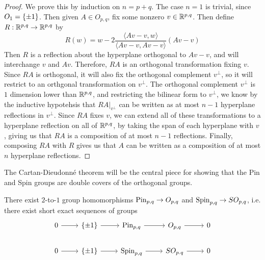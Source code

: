 %
\begin{proof}
We prove this by induction on $n = p+q$. The case $n=1$ is trivial, since
$O_1 = \left\lbrace \pm 1 \right\rbrace$. Then given $A \in O_{p,q}$, fix some nonzero $v \in \mathbb{R}^{p,q}$.
Then define $R : \mathbb{R}^{p,q} \to \mathbb{R}^{p,q}$ by
\[
R(w) = w - 2 \frac{\langle Av - v,w \rangle}{\langle Av -v, Av - v\rangle}(Av - v)
\]
Then $R$ is a reflection about the hyperplane orthogonal to $Av - v$,
and will interchange $v$ and $Av$. Therefore, $RA$ is an orthogonal transformation
fixing $v$. Since $RA$ is orthogonal, it will also fix the orthogonal complement
$v^\perp$, so it will restrict to an orthgonal transformation on $v^\perp$. The
orthogonal complement $v^\perp$ is $1$ dimension lower than $\mathbb{R}^{p,q}$, and restricting
the bilinear form to $v^\perp$, we know by the inductive hypotehsis that
$RA\vert_{v^\perp}$ can be written as at most $n-1$ hyperplane reflections in
$v^\perp$. Since $RA$ fixes $v$, we can extend all of these transformations to
a hyperplane reflection on all of $\mathbb{R}^{p,q}$, by taking the span of each hyperplane
with $v$, giving us that $RA$ is a composition of at most $n-1$ reflections. Finally,
composing $RA$ with $R$ gives us that $A$ can be written as a composition of at most
$n$ hyperplane reflections.
\end{proof}
%
The Cartan-Dieudonn\'e theorem will be the central piece for showing that the
Pin and Spin groups are double covers of the orthogonal groups.
%
\begin{thm}
There exist $2$-to-$1$ group homomorphisms $\mathrm{Pin}_{p,q} \to O_{p,q}$ and
$\mathrm{Spin}_{p,q} \to SO_{p,q}$, i.e. there exist short exact sequences of groups
\[\begin{tikzcd}
0 \ar[r] & \set{\pm 1} \ar[r] & \Pin_{p,q} \ar[r] & O_{p,q} \ar[r] & 0 \\
0 \ar[r] & \set{\pm 1} \ar[r] &\Spin_{p,q} \ar[r] & SO_{p.q} \ar[r] & 0
\end{tikzcd}\]
\end{thm}
%
